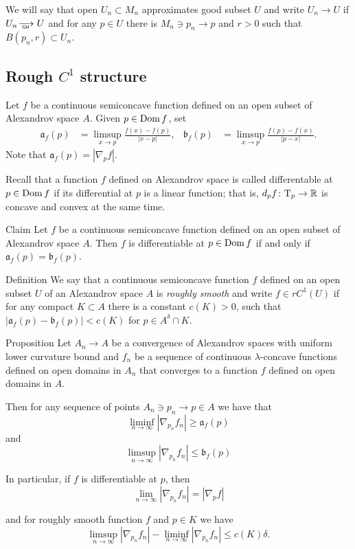  We will say that open $U_n\subset M_n$
approximates good subset $U$ and write $U_n\to U$
if $U_n\GHto U$ and for any $p\in U$ there is $M_n\ni p_n\to p$
and $r>0$ such that $B(p_n,r)\subset U_n$.
 
 \subsection{Rough $C^1$ structure }\label{sec:rC}
 
 
Let $f$ be a continuous semiconcave function defined on an open subset of Alexandrov space $A$.
Given $p\in \mathop{\rm Dom} f$, set 
\begin{align*}
\mathfrak{a}_f(p)&=\limsup_{x\to p}\frac{f(x)-f(p)}{|x-p|},
&
\mathfrak{b}_f(p)&=\limsup_{x\to p}\frac{f(p)-f(x)}{|p-x|}.
\end{align*}
Note that $\mathfrak{a}_f(p)=|\nabla_pf|$.



Recall that a function $f$ defined on Alexandrov space is called differentable at $p\in \mathop{\rm Dom} f$ if its differential at $p$ is a linear function;
that is, $d_pf\colon\mathrm{T}_p\to\mathbb{R}$ is concave and convex at the same time.

\begin{thm}{Claim} Let $f$ be a continuous semiconcave function defined on an open subset of Alexandrov space $A$.
Then  $f$ is differentiable at $p\in\mathop{\rm Dom} f$ if and only if $\mathfrak{a}_f(p)=\mathfrak{b}_f(p)$.
\end{thm}





\begin{thm}{Definition}
We say that a continuous semiconcave function $f$  defined
on an open subset $U$ of an Alexandrov space $A$
is \emph { roughly smooth}
and write $f\in rC^1(U)$
if 
for any compact $K\subset A$ there
is a constant $c(K)>0$, such that
$|\mathfrak{a}_f(p)-\mathfrak{b}_f(p)|< c(K)   $
for $p\in A^\delta\cap K$.
\end{thm}

\begin{thm}{Proposition}\label{prop:ab}
Let $A_n\to A$ be a convergence of Alexandrov spaces with uniform lower curvature bound
and $f_n$ be a sequence of continuous $\lambda$-concave functions defined on open domains in  $A_n$ that converges to a function $f$ defined on open domains in  $A$.

Then for any sequence of points $A_n\ni p_n\to p\in A$ we have
that 
\[\liminf_{n\to\infty}|\nabla_{p_n}f_n|\ge \mathfrak{a}_{f}(p)\]
and 
\[\limsup_{n\to\infty}|\nabla_{p_n}f_n|\le \mathfrak{b}_{f}(p)\]

In particular, if $f$ is differentiable at $p$, then 
\[\lim_{n\to\infty}|\nabla_{p_n}f_n|= |\nabla_{p}f|\]


and for   roughly smooth function $f$
and $p\in K$ we have
\[
\limsup_{n\to\infty}|\nabla_{p_n}f_n|-
\liminf_{n\to\infty}|\nabla_{p_n}f_n|
\le c(K)\delta. \]
 

\end{thm}




